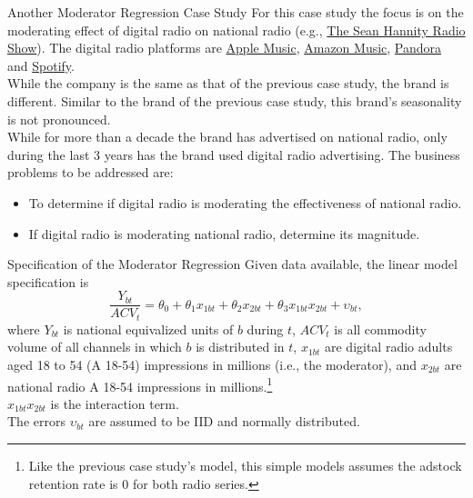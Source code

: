 \documentclass[pdf]{beamer}
\theoremstyle{remark}
\theoremstyle{definition}
\begin{document}
\begin{frame}[t]{Another Moderator Regression Case Study}
 For this case study the focus is on the moderating effect of digital radio on national radio (e.g., \href{https://www.iheart.com/podcast/51-the-sean-hannity-show-24392822/}{The Sean Hannity Radio Show}).  The digital radio platforms are \href{https://www.apple.com/apple-music/}{Apple Music}, \href{https://music.amazon.com/}{Amazon Music}, \href{https://www.pandora.com/}{Pandora} and \href{https://open.spotify.com/?}{Spotify}.  \\
 \vspace{1.5ex} 
 While the company is the same as that of the previous case study, the brand is different.  Similar to the brand of the previous case study, this brand's seasonality is not pronounced. \\
\vspace{1.5ex}
While for more than a decade the brand has advertised on national radio, only during the last 3 years has the brand used digital radio advertising.  The business problems to be addressed are: \\
\vspace{0.0ex}
\small
\begin{itemize} 
\item To determine if digital radio is moderating the effectiveness of national radio.
\item If digital radio is moderating national radio, determine its magnitude. 
\end{itemize}
\end{frame}

\begin{frame}[t]{Specification of the Moderator Regression}
Given data available, the linear model specification is  \\
\vspace{-1.0ex}
\small
\begin{equation} \label{eq:a}
\frac{Y_{bt}}{ACV_{t}} = \theta_0 + \theta_1 x_{1bt} + \theta_2 x_{2bt} + \theta_3 x_{1bt}x_{2bt} + \upsilon_{bt},
 \end{equation}
 \normalsize
where $Y_{bt}$ is national equivalized units of $b$ during $t$, $ACV_{t}$ is all commodity volume of all channels in which $b$ is distributed in $t$, $x_{1bt}$ are digital radio adults aged 18 to 54 (A 18-54) impressions in millions (i.e., the moderator), and $x_{2bt}$ are national radio A 18-54 impressions in millions.\footnote{Like the previous case study's model, this simple models assumes the adstock retention rate is 0 for both radio series.} \\
\vspace{1.5ex}
 $ x_{1bt}x_{2bt}$ is the interaction term.\\
\vspace{1.5ex}
 The errors $\upsilon_{bt}$ are assumed to be IID and normally distributed.  
 \end{frame}
\end{document}

